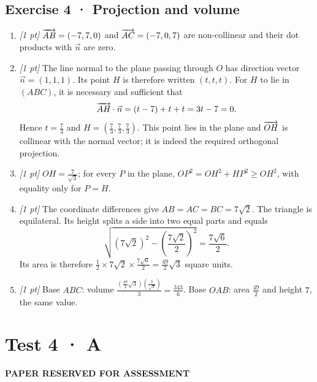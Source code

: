 \subsection*{Exercise 4 · Projection and volume}\begin{enumerate}

\item \textit{[1 pt]} $\overrightarrow{AB}=(-7,7,0)$ and $\overrightarrow{AC}=(-7,0,7)$ are non-collinear and their dot products with $\vec n$ are zero.

\item \textit{[1 pt]} The line normal to the plane passing through $O$ has direction vector $\vec n=(1,1,1)$. Its point $H$ is therefore written $(t,t,t)$. For $H$ to lie in $(ABC)$, it is necessary and sufficient that
\[\overrightarrow{AH}\cdot\vec n=(t-7)+t+t=3t-7=0.\]
Hence $t=\frac{7}{3}$ and $H=(\frac{7}{3},\frac{7}{3},\frac{7}{3})$. This point lies in the plane and $\overrightarrow{OH}$ is collinear with the normal vector; it is indeed the required orthogonal projection.

\item \textit{[1 pt]} $OH=\frac{7}{\sqrt{3}}$; for every $P$ in the plane, $OP^2=OH^2+HP^2\ge OH^2$, with equality only for $P=H$.

\item \textit{[1 pt]} The coordinate differences give $AB=AC=BC=7\sqrt2$. The triangle is equilateral. Its height splits a side into two equal parts and equals
\[\sqrt{(7\sqrt2)^2-(\frac{7\sqrt{2}}{2})^2}=\frac{7\sqrt6}{2}.\]
Its area is therefore $\frac12\times 7\sqrt2\times\frac{7\sqrt6}{2}=\frac{49}{2}\sqrt3$ square units.

\item \textit{[1 pt]} Base $ABC$: volume $\frac{(\frac{49}{2}\sqrt3)(\frac{7}{\sqrt{3}})}{3}=\frac{343}{6}$. Base $OAB$: area $\frac{49}{2}$ and height $7$, the same value.

\end{enumerate}

\fi

\ifprof

\clearpage{}\label{sujet:6-3}

\section*{Test 4 · A}

{\sffamily\bfseries\color{amber}PAPER RESERVED FOR ASSESSMENT\par}

